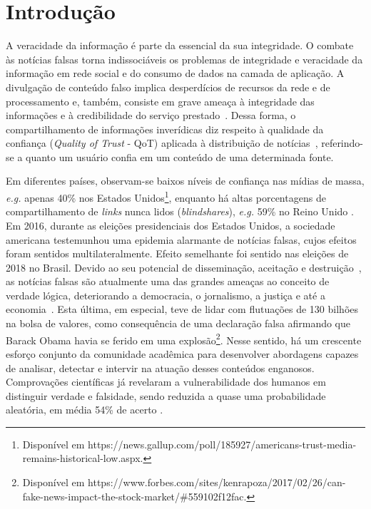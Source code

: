 \documentclass{SBCbookchapter}
\begin{document}
\section{Introdução}

A veracidade da informação é parte da essencial da sua integridade. O combate às notícias falsas torna indissociáveis os problemas de integridade e veracidade da informação em rede social e do consumo de dados na camada de aplicação. A divulgação de conteúdo falso implica desperdícios de recursos da rede e de processamento e, também, consiste em grave ameaça à integridade das informações e à credibilidade do serviço prestado~\cite{nicollasspl2020}. Dessa forma, o compartilhamento de informações inverídicas diz respeito à qualidade da confiança (\textit{Quality of Trust} - QoT) aplicada à distribuição de notícias~\cite{liu2010quality}, referindo-se a quanto um usuário confia em um conteúdo de uma determinada fonte. 

Em diferentes países, observam-se baixos níveis de confiança nas mídias de massa, \textit{e.g.} apenas 40\% nos Estados Unidos\footnote{Disponível em https://news.gallup.com/poll/185927/americans-trust-media-remains-historical-low.aspx.}, enquanto há altas porcentagens de compartilhamento de \textit{links} nunca lidos (\textit{blindshares}), \textit{e.g.} 59\% no Reino Unido \cite{gabielkov:hal-01281190}.
Em 2016, durante as eleições presidenciais dos Estados Unidos, a sociedade americana testemunhou uma epidemia alarmante de notícias falsas, cujos efeitos foram sentidos multilateralmente. Efeito semelhante foi sentido nas eleições de 2018 no Brasil. Devido ao seu potencial de disseminação, aceitação e destruição~\cite{science-spread-fakenews}, as notícias falsas são atualmente uma das grandes ameaças ao conceito de verdade lógica, deteriorando a democracia, o jornalismo, a justiça e até a economia~\cite{zhou2018fake,wang2017liar}. Esta última, em especial, teve de lidar com flutuações de 130 bilhões na bolsa de valores, como consequência de uma declaração falsa afirmando que Barack Obama havia se ferido em uma explosão\footnote{Disponível em https://www.forbes.com/sites/kenrapoza/2017/02/26/can-fake-news-impact-the-stock-market/\#559102f12fac.}. 
Nesse sentido, há um crescente esforço conjunto da comunidade acadêmica para desenvolver abordagens capazes de analisar, detectar e intervir na atuação desses conteúdos enganosos. Comprovações científicas já revelaram a vulnerabilidade dos humanos em distinguir verdade e falsidade, sendo reduzida a quase uma probabilidade aleatória, em média 54\% de acerto \cite{zhou2018fake,wang2017liar,rubin2010deception,rubin2016fake}.
\end{document}
